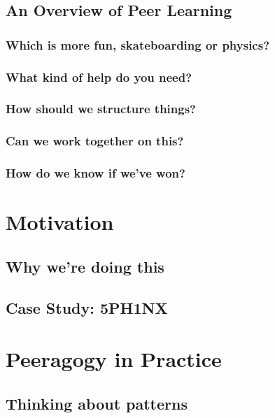 \documentclass[ebook, 12pt, twoside]{memoir}
\begin{document}
\chapter[\textbf{An Overview}]{An Overview of Peer Learning}
%

%
\section*{Which is more fun, skateboarding or physics?}

%
\section*{What kind of help do you need?}

%
\section*{How should we structure things?}

%
\section*{Can we work together on this?}

%
\section*{How do we know if we've won?}



\part{Motivation} %
%
\chapter[\textbf{Why we're doing this}]{Why we're doing this}

%
\chapter[\textbf{Case Study: 5PH1NX}]{Case Study: 5PH1NX}
%



\part{Peeragogy in Practice}  %
%
\chapter[\textbf{Thinking about patterns}]{Thinking about patterns}

%
\end{document}

